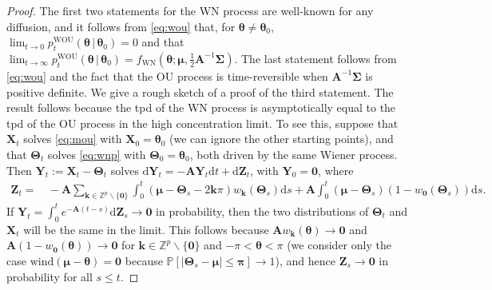 \documentclass[oneside,11pt]{article}
\newcommand{\Z}{\mathbb{Z}}
\newcommand{\rd}{\mathrm{d}}
\newcommand{\bX}{\mathbf{X}}
\newcommand{\bY}{\mathbf{Y}}
\newcommand{\bZ}{\mathbf{Z}}
\newcommand{\bmu}{\boldsymbol\mu}
\newcommand{\bk}{\mathbf{k}}
\newcommand{\zero}{\mathbf{0}}
\newcommand{\btheta}{\boldsymbol\theta}
\newcommand{\bTheta}{\boldsymbol\Theta}
\newcommand{\bSigma}{\boldsymbol\Sigma}
\newcommand{\bA}{\mathbf{A}}
\newcommand{\lrp}[1]{\left(#1\right)}
\begin{document}
\begin{proof}
The first two statements for the WN process are well-known for any diffusion, and it
follows from \eqref{eq:wou} that, for $\btheta
\neq \btheta_0$, $\lim_{t\to 0}p^\mathrm{WOU}_t(\btheta\,|\,\btheta_0) = 0$ and that $\lim_{t\to\infty}
p^\mathrm{WOU}_t(\btheta\,|\,\btheta_0) =
f_{\mathrm{WN}}(\btheta;\bmu,\frac{1}{2}\bA^{-1}\bSigma)$. The last
statement follows from \eqref{eq:wou} and the fact that the OU process is time-reversible when
$\bA^{-1}\bSigma$ is positive definite. We give a rough
sketch of a proof of the third statement. The result follows because
the tpd of the WN process is asymptotically equal to the tpd of the OU
process in the high concentration limit. To see this, suppose that
$\bX_t$ solves \eqref{eq:mou} with $\bX_0 = \btheta_0$ (we can ignore
the other starting points), and that $\bTheta_t$ solves \eqref{eq:wnp}
with $\bTheta_0 = \btheta_0$, both driven by the same Wiener
process. Then $\bY_t:= \bX_t - \bTheta_t$ solves $\rd\bY_t = -\bA
\bY_t \rd t + \rd \bZ_t$, with $\bY_0 = \zero$, where
\begin{align*}
\bZ_t =&\, -\bA \sum_{\bk\in\Z^p\backslash \{\zero\}}\int_0^t \lrp{\bmu-\bTheta_s-2\bk\pi}
w_{\bk}(\bTheta_s) \rd s + \bA \int_0^t \lrp{\bmu-\bTheta_s}(1-w_{\zero}(\bTheta_s)) \rd s.
\end{align*}
If $\bY_t = \int_0^t e^{-\bA(t-s)}\rd\bZ_s \rightarrow \zero$ in probability, then the two distributions of $\bTheta_t$ and $\bX_t$ will be the same in the limit. This follows because
$\bA w_{\bk}(\btheta) \rightarrow \zero$ and $\bA (1- w_{\zero}(\btheta)) \rightarrow
\zero$ for $\bk \in \Z^p\backslash \{ \zero\}$ and $-\pi < \btheta < \pi$ (we consider only the case $\mathrm{wind}(\bmu-\btheta) = \zero$ because $\mathbb{P}[|\bTheta_s-\bmu|\leq \boldsymbol{\pi}]\to1$), and hence $\bZ_s \rightarrow \zero$ in probability for all $s \leq t$.
\end{proof}
\end{document}

